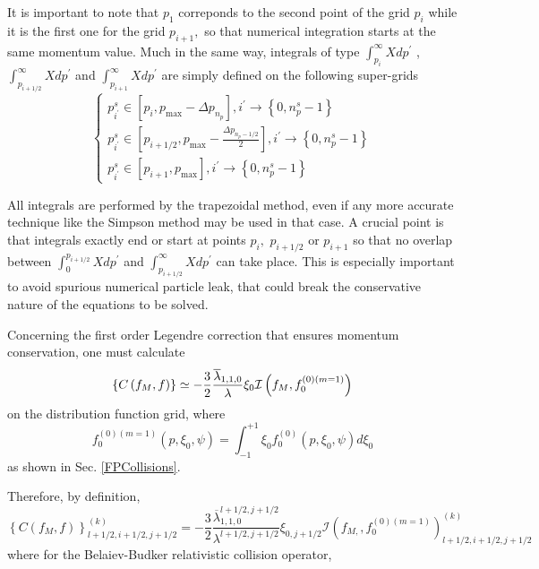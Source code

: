 It is important to note that $p_{1}$ correponds to the second point of the
grid $p_{i}$ while it is the first one for the grid $p_{i+1},$ so that
numerical integration starts at the same momentum value. Much in the same
way, integrals of type $\int_{p_{i}}^{\infty }Xdp^{\prime }$ , $%
\int_{p_{i+1/2}}^{\infty }Xdp^{\prime }$ and $\int_{p_{i+1}}^{\infty
}Xdp^{\prime }$ are simply defined on the following super-grids
\begin{equation}
\left\{
\begin{array}{l}
p_{i^{\prime }}^{s}\in \left[ p_{i},p_{\max }-\Delta p_{n_{p}}\right]
,i^{\prime }\rightarrow \left\{ 0,n_{p}^{s}-1\right\} \\
p_{i^{\prime }}^{s}\in \left[ p_{i+1/2},p_{\max }-\frac{\Delta p_{n_{p}-1/2}%
}{2}\right] ,i^{\prime }\rightarrow \left\{ 0,n_{p}^{s}-1\right\} \\
p_{i^{\prime }}^{s}\in \left[ p_{i+1},p_{\max }\right] ,i^{\prime
}\rightarrow \left\{ 0,n_{p}^{s}-1\right\}
\end{array}
\right.
\end{equation}

All integrals are performed by the trapezoidal method, even if any more
accurate technique like the Simpson method may be used in that case. A
crucial point is that integrals exactly end or start at points $p_{i},$ $%
p_{i+1/2}$ or $p_{i+1}$ so that no overlap between $%
\int_{0}^{p_{i+1/2}}Xdp^{\prime }$ and $\int_{p_{i+1/2}}^{\infty
}Xdp^{\prime }$ can take place. This is especially important to avoid
spurious numerical particle leak, that could break the conservative nature
of the equations to be solved.

Concerning the first order Legendre correction that ensures momentum
conservation, one must calculate
\begin{equation}
\left\{ C\left( f_{M},f\right) \right\} \simeq -\frac{3}{2}\frac{\overline{%
\lambda }_{1,1,0}}{\lambda }\xi _{0}\mathcal{I}\left( f_{M},f_{0}^{\left(
0\right) \left( m=1\right) }\right)
\end{equation}
on the distribution function grid, where
\begin{equation}
f_{0}^{\left( 0\right) \left( m=1\right) }\left( p,\xi _{0},\psi \right)
=\int_{-1}^{+1}\xi _{0}f_{0}^{\left( 0\right) }\left( p,\xi _{0},\psi
\right) d\xi _{0}
\end{equation}
as shown in Sec. \ref{FPCollisions}.

Therefore, by definition,
\begin{equation}
\left\{ C\left( f_{M},f\right) \right\} _{l+1/2,i+1/2,j+1/2}^{\left(
k\right) }=-\frac{3}{2}\frac{\overline{\lambda }_{1,1,0}^{l+1/2,j+1/2}}{
\lambda ^{l+1/2,j+1/2}}\xi _{0,j+1/2}\mathcal{I}\left( f_{M,},f_{0}^{\left(
0\right) \left( m=1\right) }\right) _{l+1/2,i+1/2,j+1/2}^{\left( k\right) }
\end{equation}
where for the Belaiev-Budker relativistic collision operator,

